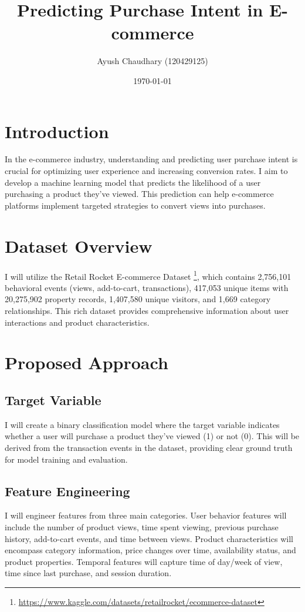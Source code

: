 \documentclass[12pt]{article}
\title{Predicting Purchase Intent in E-commerce}
\author{Ayush Chaudhary (120429125)}
\date{\today}
\begin{document}
\maketitle

\section{Introduction}
In the e-commerce industry, understanding and predicting user purchase intent is crucial for optimizing user experience and increasing conversion rates. I aim to develop a machine learning model that predicts the likelihood of a user purchasing a product they've viewed. This prediction can help e-commerce platforms implement targeted strategies to convert views into purchases.

\section{Dataset Overview}
I will utilize the Retail Rocket E-commerce Dataset \footnote{\url{https://www.kaggle.com/datasets/retailrocket/ecommerce-dataset}}, which contains 2,756,101 behavioral events (views, add-to-cart, transactions), 417,053 unique items with 20,275,902 property records, 1,407,580 unique visitors, and 1,669 category relationships. This rich dataset provides comprehensive information about user interactions and product characteristics.

\section{Proposed Approach}

\subsection{Target Variable}
I will create a binary classification model where the target variable indicates whether a user will purchase a product they've viewed (1) or not (0). This will be derived from the transaction events in the dataset, providing clear ground truth for model training and evaluation.

\subsection{Feature Engineering}
I will engineer features from three main categories. User behavior features will include the number of product views, time spent viewing, previous purchase history, add-to-cart events, and time between views. Product characteristics will encompass category information, price changes over time, availability status, and product properties. Temporal features will capture time of day/week of view, time since last purchase, and session duration.
\end{document}

